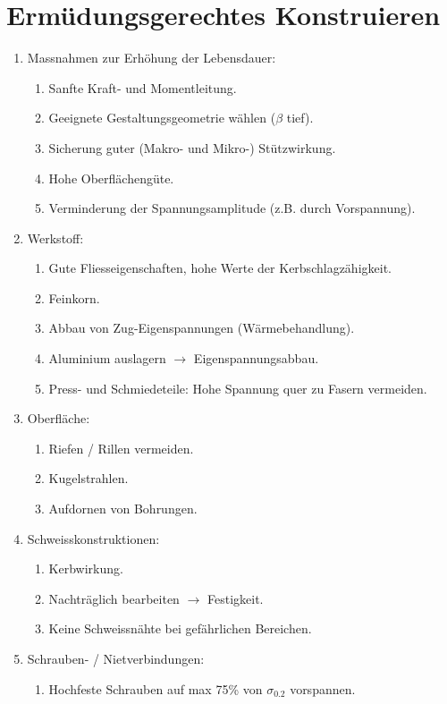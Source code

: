 \section{Ermüdungsgerechtes Konstruieren} %
	\begin{enumerate}
		\item Massnahmen zur Erhöhung der Lebensdauer:
			\begin{enumerate}
				\item Sanfte Kraft- und Momentleitung.
				\item Geeignete Gestaltungsgeometrie wählen ($\beta$ tief).
				\item Sicherung guter (Makro- und Mikro-) Stützwirkung.
				\item Hohe Oberflächengüte.
				\item Verminderung der Spannungsamplitude (z.B. durch Vorspannung).
			\end{enumerate}
		\item Werkstoff:
			\begin{enumerate}
				\item Gute Fliesseigenschaften, hohe Werte der Kerbschlagzähigkeit.
				\item Feinkorn.
				\item Abbau von Zug-Eigenspannungen (Wärmebehandlung).
				\item Aluminium auslagern $\rightarrow$ Eigenspannungsabbau.
				\item Press- und Schmiedeteile: Hohe Spannung quer zu Fasern vermeiden.
			\end{enumerate}
		\item Oberfläche:
			\begin{enumerate}
				\item Riefen / Rillen vermeiden.
				\item Kugelstrahlen.
				\item Aufdornen von Bohrungen.
			\end{enumerate}
		\item Schweisskonstruktionen:
			\begin{enumerate}
				\item Kerbwirkung.
				\item Nachträglich bearbeiten $\rightarrow$ Festigkeit.
				\item Keine Schweissnähte bei gefährlichen Bereichen.
			\end{enumerate}
		\item Schrauben- / Nietverbindungen:
			\begin{enumerate}
				\item Hochfeste Schrauben auf max 75\% von $\sigma_{0.2}$ vorspannen.
			\end{enumerate}
	\end{enumerate}
